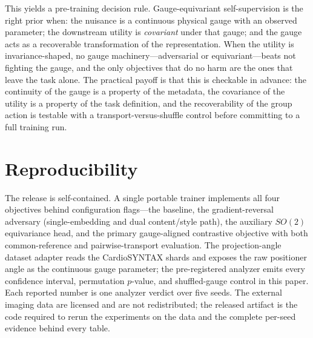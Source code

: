 \documentclass[11pt]{article}
\begin{document}
This yields a pre-training decision rule. Gauge-equivariant self-supervision is the right prior when:
the nuisance is a continuous physical gauge with an observed parameter; the downstream utility is
\emph{covariant} under that gauge; and the gauge acts as a recoverable transformation of the
representation. When the utility is invariance-shaped, no gauge machinery---adversarial or
equivariant---beats not fighting the gauge, and the only objectives that do no harm are the ones that
leave the task alone. The practical payoff is that this is checkable in advance: the continuity of the
gauge is a property of the metadata, the covariance of the utility is a property of the task
definition, and the recoverability of the group action is testable with a transport-versus-shuffle
control before committing to a full training run.

\section{Reproducibility}\label{sec:repro}

The release is self-contained. A single portable trainer implements all four objectives behind
configuration flags---the baseline, the gradient-reversal adversary (single-embedding and dual
content/style path), the auxiliary $SO(2)$ equivariance head, and the primary gauge-aligned
contrastive objective with both common-reference and pairwise-transport evaluation. The
projection-angle dataset adapter reads the CardioSYNTAX shards and exposes the raw positioner angle
as the continuous gauge parameter; the pre-registered analyzer emits every confidence interval,
permutation $p$-value, and shuffled-gauge control in this paper. Each reported number is one
analyzer verdict over five seeds. The external imaging data are licensed and are not redistributed;
the released artifact is the code required to rerun the experiments on the data and the complete
per-seed evidence behind every table.



\end{document}
